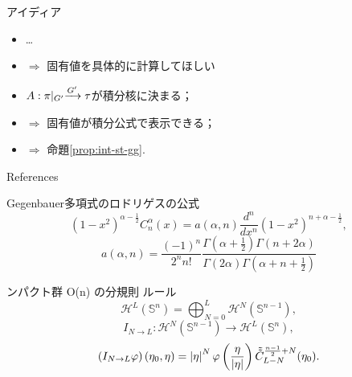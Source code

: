 \documentclass[pdf,notes]{beamer}
\renewcommand{\implies}{\Rightarrow}
\begin{document}
\begin{frame}{アイディア}
	\begin{itemize}%
		\item \ldots
		\item $\implies$ 固有値を具体的に計算してほしい
		\item $\mysbo$が積分核に決まる；
		\item $\implies$ 固有値が積分公式で表示できる；
		\item $\implies$ 命題\kern-0.1cm\ref{prop:int-st-gg}.
	\end{itemize}
\end{frame}
\appendix
\begin{frame}[allowframebreaks]{References}
	
	\nocite{Selberg:411367}
	\nocite{warnaar2010sl3}
	\nocite{dotsenko1985four}
	\nocite{tarasov2003selberg}

\end{frame}
\addtocounter{framenumber}{-3}
\begin{frame}[noframenumbering]{Gegenbauer多項式のロドリゲスの公式}
			\begin{equation*}
				(1-x^2)^{\alpha-\frac{1}{2}}C_n^\alpha(x)=a(\alpha,n)
				\frac{d^n}{dx^n} (1-x^2)^{n+\alpha-\frac{1}{2}},
			\end{equation*}
			\begin{equation*}
				a(\alpha,n)=\frac{(-1)^n}{2^nn!}\frac{\Gamma\left( \alpha+\frac{1}{2} \right)\Gamma\left( n+2\alpha \right)}{\Gamma(2\alpha)\Gamma\left(\alpha+n+\frac{1}{2}  \right)}
			\end{equation*}
\end{frame}
\begin{frame}[noframenumbering]{ンパクト群 O(n) の分規則 ルール}
	\begin{equation*}
		\mathcal{H}^L(\mathbb{S}^n)=\bigoplus_{N=0}^L \mathcal{H}^N(\mathbb{S}^{n-1}),
	\end{equation*}
	\begin{equation*}
		I_{N\to L}:\mathcal{H}^N(\mathbb{S}^{n-1})\to \mathcal{H}^L(\mathbb{S}^n),
	\end{equation*}
	\begin{equation*}
		\left(I_{N\to L}\varphi  \right)(\eta_0,\eta)=\left|\eta\right|^N\varphi\left( \frac{\eta}{\left|\eta\right|} \right)\tilde{\tilde{C}}^{\frac{n-1}{2}+N}_{L-N}(\eta_0).
	\end{equation*}
\end{frame}
\end{document}
